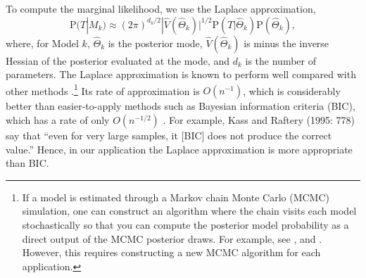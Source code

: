 \documentclass[11pt,titlepage]{article}
\renewcommand{\P}{\text{P}}
\begin{document}
To compute the marginal likelihood, we use the Laplace approximation,
\begin{equation}
  \P(T|M_k) \approx (2 \pi)^{{d_k}/2}|\widehat V(\hat\Theta_k)|^{1/2}
  \P(T|\hat{\Theta}_k) \P(\hat{\Theta}_k),
\end{equation}
where, for Model $k$, $\hat{\Theta}_k$ is the posterior mode, $\hat
V(\hat\Theta_k)$ is minus the inverse Hessian of the posterior
evaluated at the mode, and $d_k$ is the number of parameters.  The
Laplace approximation is known to perform well compared with other
methods
\citep{raft:96,lewi:raft:97,dici:kass:raft:wass:97}.\footnote{If a
  model is estimated through a Markov chain Monte Carlo (MCMC)
  simulation, one can construct an algorithm where the chain visits
  each model stochastically so that you can compute the posterior
  model probability as a direct output of the MCMC posterior draws.
  For example, see \citet{geor:mccu:93}, \citet{carl:chib:95} and
  \citet{chib:95}.  However, this requires constructing a new MCMC
  algorithm for each application.}  Its rate of approximation is
$O(n^{-1})$, which is considerably better than easier-to-apply methods
such as Bayesian information criteria (BIC), which has a rate of only
$O(n^{-1/2})$ \citep{kass:tier:kada:89}.  For example, Kass and
Raftery (1995: 778) say that ``even for very large samples, it [BIC]
does not produce the correct value.''  Hence, in our application the
Laplace approximation is more appropriate than BIC.

\singlespacing


\end{document}
